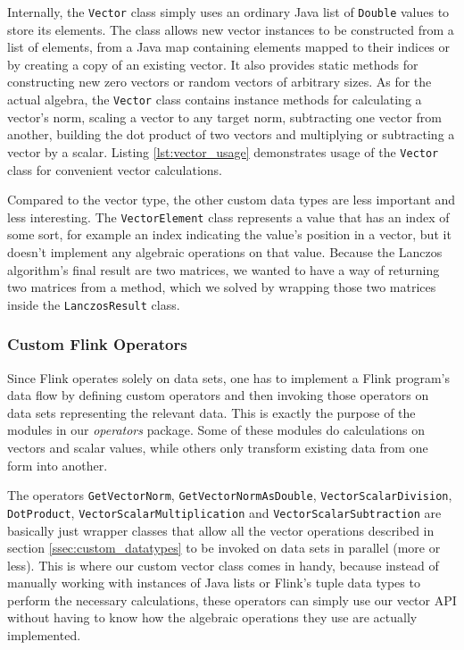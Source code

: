 Internally, the \texttt{Vector} class simply uses an ordinary Java list of
\texttt{Double} values to store its elements. The class allows new vector
instances to be constructed from a list of elements, from a Java map containing
elements mapped to their indices or by creating a copy of an existing vector.
It also provides static methods for constructing new zero vectors or random
vectors of arbitrary sizes. As for the actual algebra, the \texttt{Vector}
class contains instance methods for calculating a vector's norm, scaling a
vector to any target norm, subtracting one vector from another, building the
dot product of two vectors and multiplying or subtracting a vector by a scalar.
Listing \ref{lst:vector_usage} demonstrates usage of the \texttt{Vector} class
for convenient vector calculations.


Compared to the vector type, the other custom data types are less important and
less interesting. The \texttt{VectorElement} class represents a value that has
an index of some sort, for example an index indicating the value's position in
a vector, but it doesn't implement any algebraic operations on that value.
Because the Lanczos algorithm's final result are two matrices, we wanted to
have a way of returning two matrices from a method, which we solved by wrapping
those two matrices inside the \texttt{LanczosResult} class.


\subsubsection{Custom Flink Operators}
\label{ssec:custom_operators}

Since Flink operates solely on data sets, one has to implement a Flink
program's data flow by defining custom operators and then invoking those
operators on data sets representing the relevant data. This is exactly the
purpose of the modules in our \textit{operators} package. Some of these modules
do calculations on vectors and scalar values, while others only transform
existing data from one form into another.

The operators \texttt{GetVectorNorm}, \texttt{GetVectorNormAsDouble},
\texttt{VectorScalarDivision}, \texttt{DotProduct},
\texttt{VectorScalarMultiplication} and \texttt{VectorScalarSubtraction} are
basically just wrapper classes that allow all the vector operations described
in section \ref{ssec:custom_datatypes} to be invoked on data sets in parallel
(more or less). This is where our custom vector class comes in handy, because
instead of manually working with instances of Java lists or Flink's tuple data
types to perform the necessary calculations, these operators can simply use our
vector API without having to know how the algebraic operations they use are
actually implemented.


